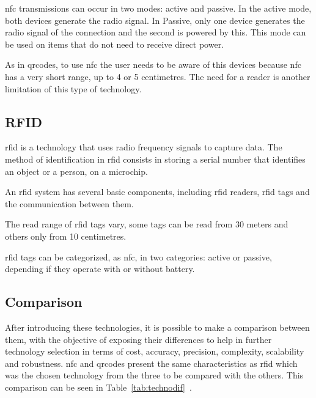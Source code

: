 \gls{nfc} transmissions can occur in two modes: active and passive.
In the active mode, both devices generate the radio signal.
In Passive, only one device generates the radio signal of the connection and the second is powered by this. This mode can be used on items that do not need to receive direct power.

As in \gls{qrcodes}, to use \gls{nfc} the user needs to be aware of this devices because \gls{nfc} has a very short range, up to 4 or 5 centimetres. The need for a reader is another limitation of this type of technology.


\subsection{RFID}
\label{subsection:rfid}
\gls{rfid} is a technology that uses radio frequency signals to capture data. The method of identification in \gls{rfid} consists in storing a serial number that identifies an object or a person, on a microchip.

An \gls{rfid} system has several basic components, including \gls{rfid} readers, \gls{rfid} tags and the communication between them.

The read range of \gls{rfid} tags vary, some tags can be read from 30 meters and others only from 10 centimetres. 

\gls{rfid} tags can be categorized, as \gls{nfc}, in two categories: active or passive, depending if they operate with or without battery.

\subsection{Comparison}
\label{subsection:comparisontechnologies}

After introducing these technologies, it is possible to make a comparison between them, with the objective of exposing their differences to help in further technology selection in terms of cost, accuracy, precision, complexity, scalability and robustness. \gls{nfc} and \gls{qrcodes} present the same characteristics as \gls{rfid} which was the chosen technology from the three to be compared with the others.
This comparison can be seen in Table~\ref{tab:technodif}~\citep{SurveyofWireless}.

